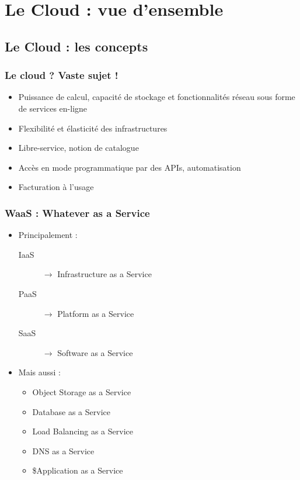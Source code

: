   \section[Cloud]{Le Cloud : vue d'ensemble}

  \subsection[Cloud]{Le Cloud : les concepts}

  \begin{frame}
    \frametitle{Le cloud ? Vaste sujet !}
    \begin{itemize}
      \item Puissance de calcul, capacité de stockage et fonctionnalités réseau sous forme de services en-ligne\pause
      \item Flexibilité et élasticité des infrastructures\pause
      \item Libre-service, notion de catalogue\pause
      \item Accès en mode programmatique par des APIs, automatisation\pause
      \item Facturation à l'usage
    \end{itemize}
  \end{frame}

  \begin{frame}
    \frametitle{WaaS : Whatever as a Service}
    \begin{itemize}
      \item Principalement :
      \pause
      \begin{description}
        \item[IaaS] $\rightarrow$ \alert<5->{Infrastructure as a Service}\pause
        \item[PaaS] $\rightarrow$ Platform as a Service\pause
        \item[SaaS] $\rightarrow$ Software as a Service\pause
      \end{description}
      \pause
      \item Mais aussi :
      \pause
      \begin{itemize}
        \item Object Storage as a Service\pause
        \item Database as a Service\pause
        \item Load Balancing as a Service\pause
        \item DNS as a Service\pause
        \item \$Application as a Service
      \end{itemize}
    \end{itemize}
  \end{frame}

